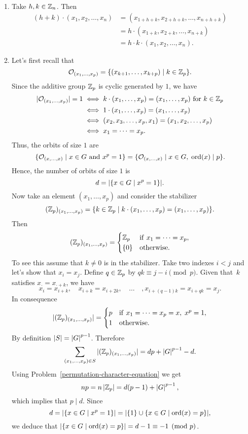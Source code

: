 \begin{solution}
\begin{enumerate}[\rm a)]
    \item Take $h,k\in\mathbb{Z}_n$. Then
    \begin{align*}
        (h+k)\cdot(x_1, x_2, \dots, x_n) &= (x_{1+h+k}, x_{2+h+k}, \dots, x_{n+h+k})\\
            &=h\cdot(x_{1+k}, x_{2+k}, \dots, x_{n+k})\\
            &=h\cdot k\cdot(x_1, x_2, \dots, x_n).
    \end{align*}

    \item Let's first recall that
    $$
        {\cal O}_{(x_1,\dots,x_p)} = \{(x_{k+1},\dots,x_{k+p})\mid k\in\mathbb{Z}_p\}.
    $$
    Since the additive group $\mathbb{Z}_p$ is cyclic generated by $1$, we have
    \begin{align*}
        |{\cal O}_{(x_1,\dots,x_p)}| = 1&\iff k\cdot(x_1,\dots,x_p) = (x_1,\dots,x_p)
                \textrm{ for }k\in\mathbb{Z}_p\\
            &\iff 1\cdot(x_1,\dots,x_p) = (x_1,\dots,x_p)\\
            &\iff(x_2, x_3,\dots,x_p,x_1) = (x_1,x_2,\dots,x_p)\\
            &\iff x_1=\cdots=x_p.
    \end{align*}
    Thus, the orbits of size $1$ are
    $$
        \{{\cal O}_{(x,\dots,x)}\mid x\in G\textrm{ and }x^p=1\}
        = \{{\cal O}_{(x,\dots,x)}\mid x\in G,\;{\rm ord}(x)\mid p\}.
    $$
    Hence, the number of orbits of size $1$ is
    $$
        d = |\{x\in G\mid x^p=1\}|.
    $$
    Now take an element $(x_1,\dots,x_p)$ and consider the stabilizer
    $$
        (\mathbb{Z}_p)_{(x_1,\dots,x_p)} = \{k\in\mathbb{Z}_p\mid k\cdot(x_1,\dots,x_p)=(x_1,\dots,x_p)\}.
    $$
    Then
    $$
        (\mathbb{Z}_p)_{(x_1,\dots,x_p)}=\begin{cases}
            \mathbb{Z}_p&{\rm if\ } x_1=\cdots=x_p,\\
            \{0\}&\rm otherwise.
        \end{cases} 
    $$
    To see this assume that $k\ne0$ is in the stabilizer. Take two indexes $i<j$ and let's show that $x_i=x_j$. Define $q\in\mathbb{Z}_p$ by $qk\equiv j-i\pmod p$. Given that~$k$ satisfies $x_\cdot= x_{\cdot+k}$, we have
    $$
        x_i=x_{i+k},\quad x_{i+k}=x_{i+2k},\quad\dots\quad,x_{i+(q-1)k}=x_{i+qk}=x_j.
    $$
    In consequence
    $$
        |(\mathbb{Z}_p)_{(x_1,\dots,x_p)}|=\begin{cases}
            p&{\rm if\ } x_1=\cdots=x_p=x,\; x^p=1,\\
            1&\rm otherwise.
        \end{cases} 
    $$
    By definition $|S|=\left\vert{G}\right\vert^{p-1}$. Therefore
    $$
        \sum_{(x_1,\dots,x_p)\in S}|(\mathbb{Z}_p)_{(x_1,\dots,x_p)}| = dp + \left\vert{G}\right\vert^{p-1}-d.
    $$
    Using Problem~\ref{permutation-character-equation} we get
    $$
        np=n\left\vert{\mathbb{Z}_p}\right\vert=d(p-1) + \left\vert{G}\right\vert^{p-1},
    $$
    which implies that $p\mid d$. Since
    $$
        d = |\{x\in G\mid x^p=1\}| = |\{1\}\cup\{x\in G\mid {\rm ord}(x)=p\}|,
    $$
    we deduce that $|\{x\in G\mid {\rm ord}(x)=p\}|=d-1\equiv-1\pmod p$.
    

\end{enumerate}
\end{solution}
